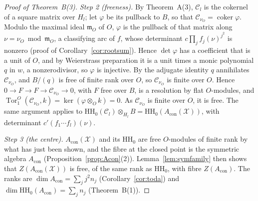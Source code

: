 \documentclass[11pt]{amsart}
\numberwithin{table}{section}
\numberwithin{figure}{section}
\numberwithin{equation}{section}
\theoremstyle{definition}
\theoremstyle{plain}
\newcommand{\Acon}{A_{\mathrm{con}}}
\newcommand{\cC}{\mathcal{C}}
\newcommand{\HH}{\mathrm{HH}}
\DeclareMathOperator{\Tor}{Tor}
\begin{document}
\begin{proof}[Proof of Theorem~B(3)]
\emph{Step 2 (freeness).} By Theorem~A(3), $\cC_l$ is the cokernel of a square matrix over $H_l$; let $\varphi$ be its pullback to $B$, so that $\cC_{\nu_O} = \operatorname{coker}\varphi$. Modulo the maximal ideal $\mathfrak m_O$ of $O$, $\varphi$ is the pullback of that matrix along $\nu = \nu_O \bmod \mathfrak m_O$, a classifying arc of $f$, whose determinant $c\prod_j f_j(\nu)^{j^2}$ is nonzero (proof of Corollary~\ref{cor:rootsum}). Hence $\det\varphi$ has a coefficient that is a unit of $O$, and by Weierstrass preparation it is a unit times a monic polynomial $q$ in $w$, a nonzerodivisor, so $\varphi$ is injective. By the adjugate identity $q$ annihilates $\cC_{\nu_O}$, and $B/(q)$ is free of finite rank over $O$, so $\cC_{\nu_O}$ is finite over $O$. Hence $0 \to F \to F \to \cC_{\nu_O} \to 0$, with $F$ free over $B$, is a resolution by flat $O$-modules, and $\Tor_1^O(\cC_{\nu_O}, k) = \ker(\varphi \otimes_O k) = 0$. As $\cC_{\nu_O}$ is finite over $O$, it is free. The same argument applies to $\HH_0(\cC_l) \otimes_{H_l} B = \HH_0(\Acon(\mathcal X))$, with determinant $c'(f_1 \cdots f_l)(\nu)$.

\emph{Step 3 (the centre).} $\Acon(\mathcal X)$ and its $\HH_0$ are free $O$-modules of finite rank by what has just been shown, and the fibre at the closed point is the symmetric algebra $\Acon$ (Proposition~\ref{prop:Acon}(2)). Lemma~\ref{lem:symfamily} then shows that $Z(\Acon(\mathcal X))$ is free, of the same rank as $\HH_0$, with fibre $Z(\Acon)$. The ranks are $\dim \Acon = \sum_j j^2 n_j$ (Corollary~\ref{cor:toda}) and $\dim \HH_0(\Acon) = \sum_j n_j$ (Theorem~B(1)).
\end{proof}
\end{document}
